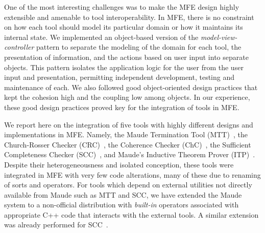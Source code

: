 One of the most interesting challenges was to make the 
MFE design highly extensible and amenable to tool interoperability.
In MFE, there is no constraint on how each tool 
should model its particular domain or how it maintains its internal
state. We implemented an object-based version of the 
{\em model-view-controller} 
pattern to separate the modeling of the domain for each tool,
the presentation of information, and the actions based on user input
into separate objects. 
This pattern isolates the application logic for the user from the 
user input and presentation, permitting independent development, 
testing and maintenance of each.
We also followed
good object-oriented design practices that kept the
cohesion high and the coupling low among objects.
In our experience, these good design practices proved
key for the integration of tools
in MFE.

We report here on the integration of five tools 
with highly different designs and implementations in MFE. Namely, 
the Maude Termination Tool (MTT)~\cite{Duran-Lucas-Meseguer:2008-ijcar},
the Church-Rosser Checker (CRC)~\cite{Duran-Meseguer:2010-wrla-crc,Duran-Meseguer:2011},
the Coherence Checker (ChC)~\cite{Duran-Meseguer:2010-wrla-chc,Duran-Meseguer:2011},
the Sufficient Completeness Checker (SCC)~\cite{Hendrix-Clavel-Meseguer:05,Hendrix-Meseguer-Ohsaki:2006},
and Maude's Inductive Theorem Prover (ITP)~\cite{Clavel-Palomino-Riesco:2006,Hendrix:2008}.
Despite their heterogeneousness and isolated conception,
these tools were integrated in MFE with very few code alterations,
many of these due to renaming of sorts and operators.
For tools which depend on external
utilities not directly available from Maude such as MTT and SCC, 
we have extended the Maude system to a non-official distribution
with {\em built-in} operators associated with appropriate
C++ code that interacts with the external tools.
A similar extension was already performed for SCC~\cite{Hendrix:2008}.


